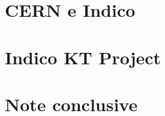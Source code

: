 



	\frenchspacing
	\raggedbottom
	\pagestyle{plain}
	

	
	
	\pagestyle{scrheadings}
	
	
%	
	
	
	
	
	\part{CERN e Indico} \label{part:CERN_indico}
		
		
	
	\part{Indico KT Project} \label{part:indico_KT_project}
		
		
		
		
		
		
	
	\part{Note conclusive} \label{part:note_conclusive}
		
		
	
	

